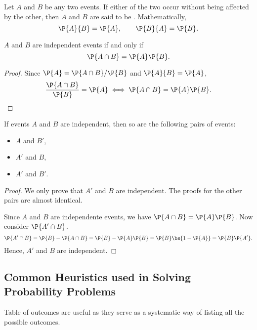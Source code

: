 \begin{definition}
    Let $A$ and $B$ be any two events. If either of the two occur without being affected by the other, then $A$ and $B$ are said to be . Mathematically, \[\P{A}{B} = \P{A}, \qquad \P{B}{A} = \P{B}.\]
\end{definition}

\begin{proposition}
    $A$ and $B$ are independent events if and only if \[\P{A \cap B} = \P{A}\P{B}.\]
\end{proposition}
\begin{proof}
    Since $\P{A} = \P{A \cap B} / \P{B}$ and $\P{A}{B} = \P{A}$, \[\frac{\P{A \cap B}}{\P{B}} = \P{A} \iff \P{A \cap B} = \P{A}\P{B}.\]
\end{proof}

\begin{proposition}
    If events $A$ and $B$ are independent, then so are the following pairs of events:
    \begin{itemize}
        \item $A$ and $B'$,
        \item $A'$ and $B$,
        \item $A'$ and $B'$.
    \end{itemize}
\end{proposition}
\begin{proof}
    We only prove that $A'$ and $B$ are independent. The proofs for the other pairs are almost identical.

    Since $A$ and $B$ are independente events, we have $\P{A \cap B} = \P{A} \P{B}$. Now consider $\P{A' \cap B}$. \[\P{A' \cap B} = \P{B} - \P{A \cap B} = \P{B} - \P{A}\P{B} = \P{B} \bs{1 - \P{A}} = \P{B} \P{A'}.\] Hence, $A'$ and $B$ are independent.
\end{proof}

\subsection{Common Heuristics used in Solving Probability Problems}

\begin{method}
    Table of outcomes are useful as they serve as a systematic way of listing all the possible outcomes.
\end{method}

